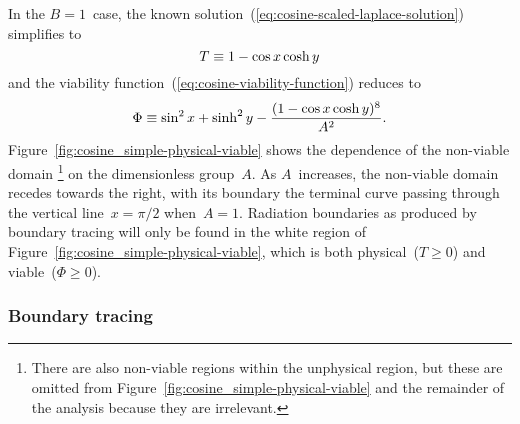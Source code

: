 In the $B = 1$~case,
the known solution~(\ref{eq:cosine-scaled-laplace-solution}) simplifies to
\begin{equation}
  T \equiv 1 - \cos x \cosh y
  \label{eq:cosine-simple-laplace-solution}
\end{equation}
and the viability function~(\ref{eq:cosine-viability-function}) reduces to
\begin{equation}
  \Phi \equiv \sin^2 x + \sinh^2 y - \frac{(1 - \cos x \cosh y) ^ 8}{A^2}.
  \label{eq:cosine-simple-viability-function}
\end{equation}
Figure~\ref{fig:cosine_simple-physical-viable} shows
the dependence of the non-viable domain%
\footnote{
  There are also non-viable regions within the unphysical region,
  but these are omitted from Figure~\ref{fig:cosine_simple-physical-viable}
  and the remainder of the analysis because they are irrelevant.
}
on the dimensionless group~$A$.
As $A$~increases, the non-viable domain recedes towards the right,
with its boundary the terminal curve
passing through the vertical line~$x = \pi/2$ when~$A = 1$.
Radiation boundaries as produced by boundary tracing will only be found
in the white region of Figure~\ref{fig:cosine_simple-physical-viable},
which is both physical~($T \ge 0$) and viable~($\Phi \ge 0$).

\begin{figure}
\end{figure}

\subsubsection{Boundary tracing}
\label{sec:cartesian.cosine.simple.tracing}

